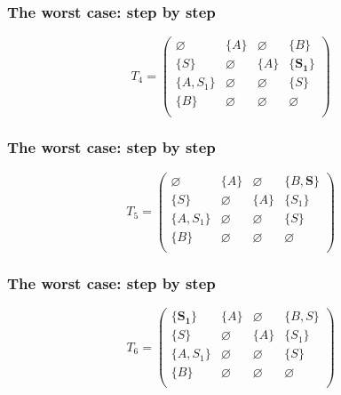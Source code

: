\documentclass[xcolor=table]{beamer}
\begin{document}
\begin{frame}[noframenumbering]

  \frametitle{The worst case: step by step}
\begin{figure}[h]
\[
T_4 = \begin{pmatrix}
\varnothing & \{A\}       & \varnothing & \{B\}       \\
\{S\}       & \varnothing & \{A\}       & \{\pmb{S_1}\}     \\
\{A, S_1\}  & \varnothing & \varnothing & \{S\}       \\
\{B\}       & \varnothing & \varnothing & \varnothing \\
\end{pmatrix}
\]
\label{ExampleQueryFirstIteration}
\end{figure}
\end{frame}

\begin{frame}[noframenumbering]

  \frametitle{The worst case: step by step}
\begin{figure}[h]
\[
T_5 = \begin{pmatrix}
\varnothing & \{A\}       & \varnothing & \{B, \pmb{S}\}    \\
\{S\}       & \varnothing & \{A\}       & \{S_1\}     \\
\{A, S_1\}  & \varnothing & \varnothing & \{S\}       \\
\{B\}       & \varnothing & \varnothing & \varnothing \\
\end{pmatrix}
\]
\label{ExampleQueryFirstIteration}
\end{figure}
\end{frame}

\begin{frame}[noframenumbering]

  \frametitle{The worst case: step by step}
\begin{figure}[h]
\[
T_6 = \begin{pmatrix}
\{\pmb{S_1}\}     & \{A\}       & \varnothing & \{B, S\}    \\
\{S\}       & \varnothing & \{A\}       & \{S_1\}     \\
\{A, S_1\}  & \varnothing & \varnothing & \{S\}       \\
\{B\}       & \varnothing & \varnothing & \varnothing \\
\end{pmatrix}
\]
\label{ExampleQueryFirstIteration}
\end{figure}
\end{frame}
\end{document}
